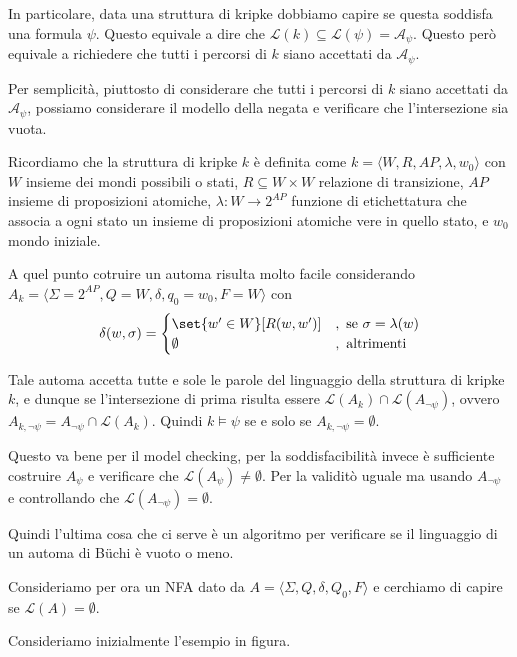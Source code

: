 In particolare, data una struttura di kripke dobbiamo capire se questa soddisfa una formula \(\psi\). Questo equivale a dire che
\(\mathcal{L}(k)\subseteq \mathcal{L}(\psi) = \mathcal{A_\psi}\). Questo però equivale a richiedere che tutti i percorsi di \(k\) siano accettati da \(\mathcal{A_\psi}\).

Per semplicità, piuttosto di considerare che tutti i percorsi di \(k\) siano accettati da \(\mathcal{A_\psi}\), possiamo considerare il modello della negata e verificare che l'intersezione sia vuota.

Ricordiamo che la struttura di kripke \(k\) è definita come \(k = \langle W, R, AP, \lambda, w_0\rangle\) con \(W\) insieme dei mondi possibili o stati, \(R \subseteq W\times W\) relazione di transizione, \(AP\) insieme di proposizioni atomiche, \(\lambda: W \to 2^{AP}\) funzione di etichettatura che associa a ogni stato un insieme di proposizioni atomiche vere in quello stato, e \(w_0\) mondo iniziale.

A quel punto cotruire un automa risulta molto facile considerando \(A_k = \langle \Sigma=2^{AP}, Q = W, \delta, q_0 = w_0,  F=W\rangle\) con
\[\delta(w,\sigma) = \begin{cases}
    \set{w' \in W}[R(w,w')] & , \text{ se } \sigma = \lambda(w) \\
    \emptyset               & , \text{ altrimenti}
  \end{cases}\]

Tale automa accetta tutte e sole le parole del linguaggio della struttura di kripke \(k\), e dunque se l'intersezione di prima risulta essere \(\mathcal{L}(A_k) \cap \mathcal{L}(A_{\neg\psi})\), ovvero \(A_{k,\neg\psi} = A_{\neg\psi} \cap \mathcal{L}(A_k)\).
Quindi \(k\models \psi\) se e solo se \(A_{k,\neg\psi} = \emptyset\).

Questo va bene per il model checking, per la soddisfacibilità invece è sufficiente costruire \(A_\psi\) e verificare che \(\mathcal{L}(A_\psi)\neq \emptyset\). Per la validitò uguale ma usando \(A_{\neg\psi}\) e controllando che \(\mathcal{L}(A_{\neg\psi}) = \emptyset\).

Quindi l'ultima cosa che ci serve è un algoritmo per verificare se il linguaggio di un automa di Büchi è vuoto o meno.

Consideriamo per ora un NFA dato da \(A = \langle \Sigma,Q,\delta,Q_0,F\rangle\) e cerchiamo di capire se \(\mathcal{L}(A) = \emptyset\).

Consideriamo inizialmente l'esempio in figura.


